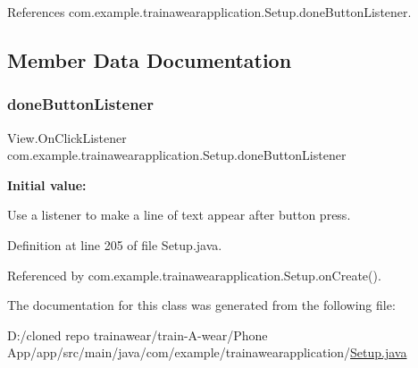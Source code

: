 References com.\+example.\+trainawearapplication.\+Setup.\+done\+Button\+Listener.



\subsection{Member Data Documentation}
\mbox{\label{classcom_1_1example_1_1trainawearapplication_1_1_setup_a6e717a2baaf80c283f516c044ae98e6c}} 
\subsubsection{\texorpdfstring{doneButtonListener}{doneButtonListener}}
{\footnotesize\ttfamily View.\+On\+Click\+Listener com.\+example.\+trainawearapplication.\+Setup.\+done\+Button\+Listener\hspace{0.3cm}{\ttfamily [private]}}

{\bfseries Initial value\+:}
\begin{DoxyCode}{0}
\DoxyCodeLine{            }
\DoxyCodeLine{}
\DoxyCodeLine{        \}}
\DoxyCodeLine{    \}}

\end{DoxyCode}


Use a listener to make a line of text appear after button press. 



Definition at line 205 of file Setup.\+java.



Referenced by com.\+example.\+trainawearapplication.\+Setup.\+on\+Create().



The documentation for this class was generated from the following file\+:\begin{DoxyCompactItemize}
\item 
D\+:/cloned repo trainawear/train-\/\+A-\/wear/\+Phone App/app/src/main/java/com/example/trainawearapplication/\mbox{\hyperlink{_setup_8java}{Setup.\+java}}\end{DoxyCompactItemize}
